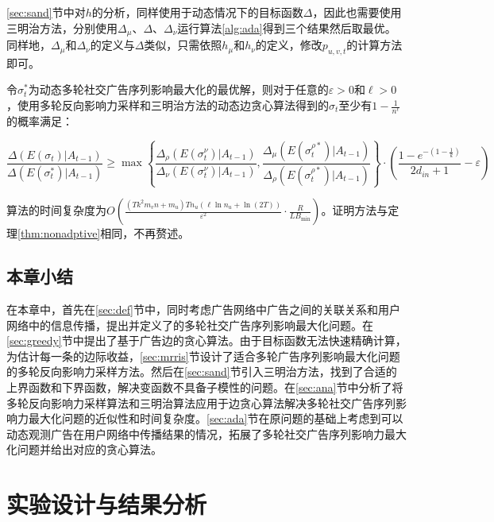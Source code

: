 \ref{sec:sand}节中对$h$的分析，同样使用于动态情况下的目标函数$\Delta$，因此也需要使用三明治方法，分别使用$\Delta_\mu$、$\Delta$、$\Delta_\nu$运行算法\ref{alg:ada}得到三个结果然后取最优。同样地，$\Delta_\mu$和$\Delta_\nu$的定义与$\Delta$类似，只需依照$h_\mu$和$h_\nu$的定义，修改$p_{u,v,t}$的计算方法即可。

\begin{theorem}
令$\sigma_t^*$为动态多轮社交广告序列影响最大化的最优解，则对于任意的$\varepsilon>0$和$\ell > 0$，使用多轮反向影响力采样和三明治方法的动态边贪心算法得到的$\sigma_t$至少有$1-\frac{1}{n^{\ell}}$的概率满足：

\begin{equation}
    \frac{\Delta(E(\sigma_t) | A_{t-1})}{\Delta(E(\sigma_t^*) | A_{t-1})}
    \ge \max\left\{\frac{\Delta_\rho(E(\sigma_t^\nu) | A_{t-1} )}{\Delta_\nu(E(\sigma_t^\nu) | A_{t-1})},\frac{\Delta_\mu(E(\sigma_t^{\rho*})  | A_{t-1})}{\Delta_\rho(E(\sigma_t^{\rho*}) | A_{t-1})} \right\}
    \cdot\left(\frac{1-e^{-(1-\frac{1}{k})}}{2d_{in}+1}-\varepsilon\right)
\end{equation}

\noindent 算法的时间复杂度为$O\left(\frac{(Tk^2 m_v n + m_u)Tn_u(\ell \ln n_u + \ln (2T))}{\varepsilon^2}\cdot\frac{R}{LB_{\min}}\right)$。证明方法与定理\ref{thm:nonadptive}相同，不再赘述。
\end{theorem}

\section{本章小结}

在本章中，首先在\ref{sec:def}节中，同时考虑广告网络中广告之间的关联关系和用户网络中的信息传播，提出并定义了的多轮社交广告序列影响最大化问题。在\ref{sec:greedy}节中提出了基于广告边的贪心算法。由于目标函数无法快速精确计算，为估计每一条的边际收益，\ref{sec:mrris}节设计了适合多轮广告序列影响最大化问题的多轮反向影响力采样方法。然后在\ref{sec:sand}节引入三明治方法，找到了合适的上界函数和下界函数，解决变函数不具备子模性的问题。在\ref{sec:ana}节中分析了将多轮反向影响力采样算法和三明治算法应用于边贪心算法解决多轮社交广告序列影响力最大化问题的近似性和时间复杂度。\ref{sec:ada}节在原问题的基础上考虑到可以动态观测广告在用户网络中传播结果的情况，拓展了多轮社交广告序列影响力最大化问题并给出对应的贪心算法。

\chapter{实验设计与结果分析}

